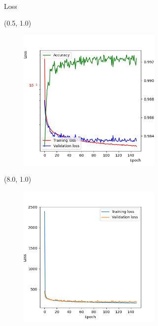 \documentclass[12pt, xcolor={dvipsnames}, aspectratio = 169]{beamer}
\begin{document}
\begin{frame}{Loss}

\begin{textblock}{7.0}(0.5, 1.0)
    \begin{figure}
        \centering
        \includegraphics[width=7.0cm]{../imgs/cls-loss.png}
    \end{figure}
\end{textblock}

\begin{textblock}{7.0}(8.0, 1.0)
    \begin{figure}
        \centering
        \includegraphics[width=7.0cm]{../imgs/reg-loss.png}
    \end{figure}
\end{textblock}

\end{frame}
\end{document}
